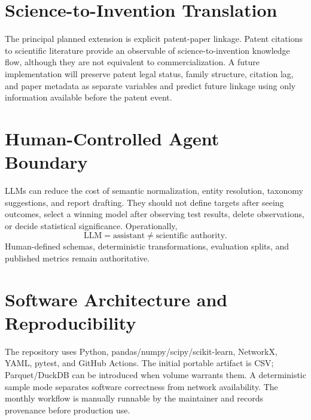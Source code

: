 \documentclass[11pt]{article}
\begin{document}
\section{Science-to-Invention Translation}
The principal planned extension is explicit patent-paper linkage. Patent citations to scientific literature provide an observable of science-to-invention knowledge flow, although they are not equivalent to commercialization. A future implementation will preserve patent legal status, family structure, citation lag, and paper metadata as separate variables and predict future linkage using only information available before the patent event.
\section{Human-Controlled Agent Boundary}
LLMs can reduce the cost of semantic normalization, entity resolution, taxonomy suggestions, and report drafting. They should not define targets after seeing outcomes, select a winning model after observing test results, delete observations, or decide statistical significance. Operationally,
\[
\text{LLM}=\text{assistant}\neq\text{scientific authority}.
\]
Human-defined schemas, deterministic transformations, evaluation splits, and published metrics remain authoritative.
\section{Software Architecture and Reproducibility}
The repository uses Python, pandas/numpy/scipy/scikit-learn, NetworkX, YAML, pytest, and GitHub Actions. The initial portable artifact is CSV; Parquet/DuckDB can be introduced when volume warrants them. A deterministic sample mode separates software correctness from network availability. The monthly workflow is manually runnable by the maintainer and records provenance before production use.
\end{document}

